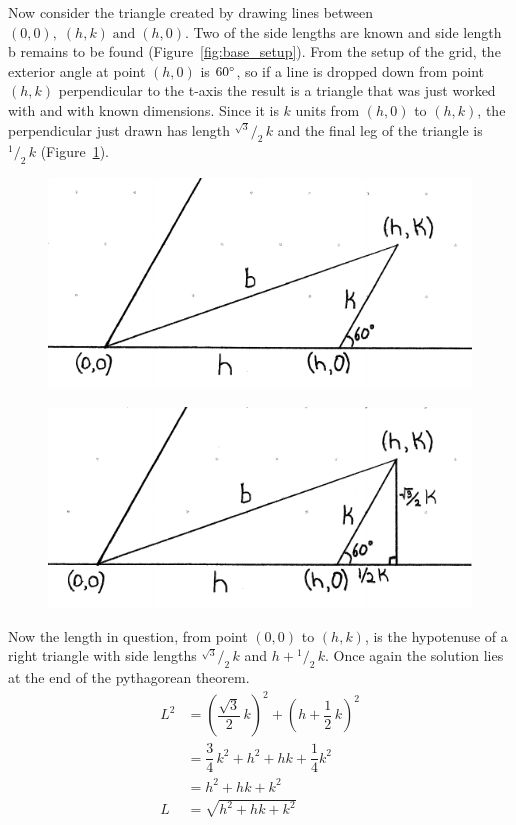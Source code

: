 \documentclass[12pt,letter]{article}
\newcommand*\rfrac[2]{{}^{#1}\!/_{#2}}
\begin{document}
Now consider the triangle created by drawing lines between $(0,0), \; (h,k) \; \text{and} \; (h,0)$. Two of the side lengths are known and side length b remains to be found (Figure~\ref{fig:base_setup}). From the setup of the grid, the exterior angle at point $(h,0)$ is $60\degree$, so if a line is dropped down from point $(h,k)$ perpendicular to the t-axis the result is a triangle that was just worked with and with known dimensions. Since it is $k$ units from $(h,0)$ to $(h,k)$, the perpendicular just drawn has length $\rfrac{\sqrt{3}} {2} \, k$ and the final leg of the triangle is $\rfrac 1 2 \, k$ (Figure~\ref{fig:base_right}).

\begin{figure}[h]
	\centering
	\begin{minipage}{0.45\textwidth}
		\centering
		\caption{}
		\includegraphics[width=\textwidth]{ddagger1.pdf}
		\label{fig:base_setup}
	\end{minipage}
	\begin{minipage}{0.45\textwidth}
		\centering
		\caption{}
		\includegraphics[width=\textwidth]{ddagger2.pdf}
		\label{fig:base_right}
	\end{minipage}
\end{figure}

Now the length in question, from point $(0,0)$ to $(h,k)$, is the hypotenuse of a right triangle with side lengths $\rfrac{\sqrt{3}} {2} \, k$ and $h+\rfrac 1 2 \, k$. Once again the solution lies at the end of the pythagorean theorem.
\begin{align*}
L^2 &= \left(\dfrac{\sqrt{3}} {2} \, k\right)^2 + \left(h+\dfrac 1 2 \, k\right)^2 \\
&= \dfrac 3 4 \, k^2 + h^2 + hk + \dfrac 1 4 k^2 \\
& = h^2 + hk + k^2 \\
L & = \sqrt{h^2 + hk + k^2}
\end{align*}
\end{document}
